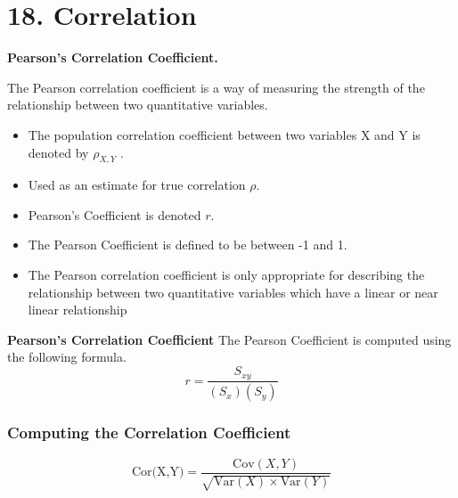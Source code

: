 
	\chapter{18. Correlation}
	
	
	
	\noindent \textbf{Pearson's Correlation Coefficient.}
	
	The Pearson correlation coefficient is a way of measuring the
	strength of the relationship between two quantitative variables.
	
	\begin{itemize}
		\item The population correlation coefficient between two variables X and
		Y is denoted by $\rho_{X,Y}$ .
		\item Used as an estimate for true correlation $\rho$.
		\item Pearson's Coefficient is denoted $r$.
		\item The Pearson Coefficient is defined to be between -1 and 1.
		\item The Pearson correlation coefficient is only appropriate for
		describing the relationship between two quantitative variables
		which have a linear or near linear relationship
	\end{itemize}
	
	\noindent \textbf{Pearson's Correlation Coefficient}
	The Pearson Coefficient is computed using the following formula.
	\[ r = \frac{S_{xy}}{(S_x)(S_y)} \]
	
	

	
	

		\subsection{Computing the Correlation Coefficient}
		
		\[ \mbox{Cor(X,Y)} = \frac{\mbox{Cov}(X,Y)}{\sqrt{\mbox{Var}(X) \times \mbox{Var}(Y)}} \]
		
		

